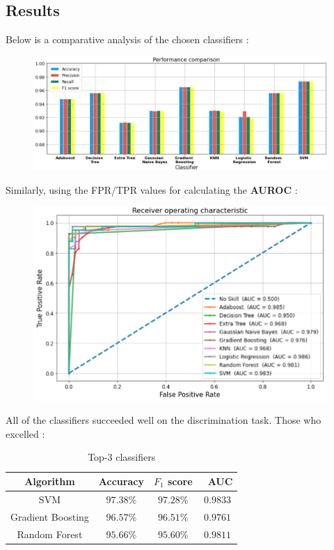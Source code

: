 \documentclass[12pt]{article}
\numberwithin{equation}{section}
\begin{document}
\begin{flushleft}
\section{Results}
Below is a comparative analysis of the chosen classifiers :
\begin{figure}[H]
\centering
\includegraphics[width=1.125 \linewidth, center]{Results_0.png}
\end{figure}
Similarly, using the FPR/TPR values for calculating the \textbf{AUROC} :
\begin{figure}[H]
\centering
\includegraphics[width=0.885 \linewidth, center]{Results_1.png}
\end{figure}
All of the classifiers succeeded well on the discrimination task. Those who excelled :

\begin{table}
\centering
\begin{tabular}{|c|c|c|c|}
\hline
\textbf{Algorithm} & \textbf{Accuracy} & $F_1$ \textbf{score} & \ \textbf{AUC} \\ \hline
SVM \hspace{2.2cm} & $97.38 \%$ & $97.28 \%$ & $0.9833$  \\ \hline
Gradient Boosting & $96.57 \%$ & $96.51 \%$ & $0.9761$  \\ \hline
Random Forest \hspace{4mm} & $95.66 \%$ & $95.60 \%$ & $0.9811$  \\ \hline
\end{tabular}
\caption*{Top-3 classifiers}
\end{table}


\end{flushleft}
\end{document}
